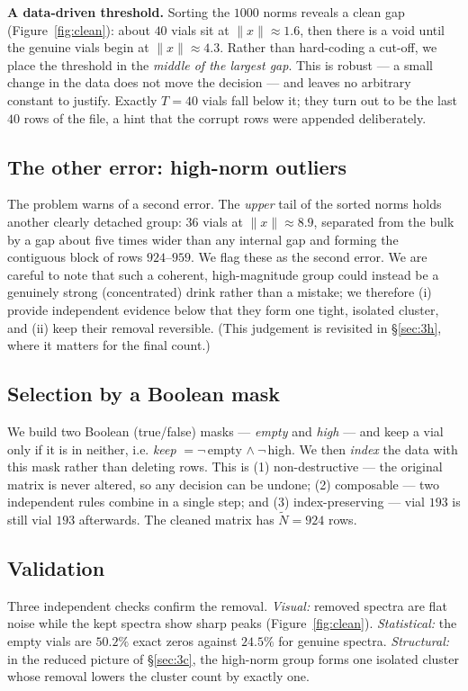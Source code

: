 \documentclass[11pt]{article}
\newcommand{\Nt}{\widetilde{N}}
\newcommand{\norm}[1]{\lVert #1 \rVert}
\theoremstyle{definition}\newtheorem{definition}{Definition}[section]
\theoremstyle{plain}\newtheorem{proposition}{Proposition}[section]
\theoremstyle{remark}\newtheorem{remark}{Remark}[section]
\begin{document}
\textbf{A data-driven threshold.} Sorting the $1000$ norms reveals a clean gap
(Figure~\ref{fig:clean}): about $40$ vials sit at $\norm{x}\approx1.6$, then there is a void
until the genuine vials begin at $\norm{x}\approx4.3$. Rather than hard-coding a cut-off, we
place the threshold in the \emph{middle of the largest gap}. This is robust --- a small change
in the data does not move the decision --- and leaves no arbitrary constant to justify. Exactly
$T=40$ vials fall below it; they turn out to be the last $40$ rows of the file, a hint that the
corrupt rows were appended deliberately.

\subsection{The other error: high-norm outliers}
The problem warns of a second error. The \emph{upper} tail of the sorted norms holds another
clearly detached group: $36$ vials at $\norm{x}\approx8.9$, separated from the bulk by a gap
about five times wider than any internal gap and forming the contiguous block of rows
$924$--$959$. We flag these as the second error. We are careful to note that such a coherent,
high-magnitude group could instead be a genuinely strong (concentrated) drink rather than a
mistake; we therefore (i) provide independent evidence below that they form one tight, isolated
cluster, and (ii) keep their removal reversible. (This judgement is revisited in
\S\ref{sec:3h}, where it matters for the final count.)

\subsection{Selection by a Boolean mask}
We build two Boolean (true/false) masks --- \emph{empty} and \emph{high} --- and keep a vial
only if it is in neither, i.e. \emph{keep} $=\lnot$\,empty $\land\ \lnot$\,high. We then
\emph{index} the data with this mask rather than deleting rows. This is (1) non-destructive ---
the original matrix is never altered, so any decision can be undone; (2) composable --- two
independent rules combine in a single step; and (3) index-preserving --- vial $193$ is still
vial $193$ afterwards. The cleaned matrix has $\Nt=924$ rows.

\subsection{Validation}
Three independent checks confirm the removal. \emph{Visual:} removed spectra are flat noise
while the kept spectra show sharp peaks (Figure~\ref{fig:clean}). \emph{Statistical:} the empty
vials are $50.2\%$ exact zeros against $24.5\%$ for genuine spectra. \emph{Structural:}
in the reduced picture of \S\ref{sec:3c}, the high-norm group forms one isolated cluster whose
removal lowers the cluster count by exactly one.
\end{document}

